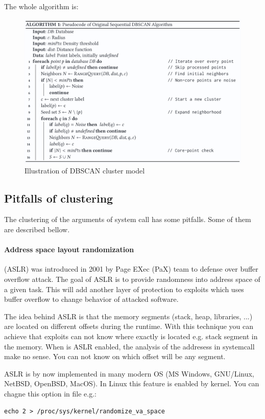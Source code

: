 	The whole algorithm is:
	\nopagebreak
	\begin{figure}[H]
		\centering
		\includegraphics[width=\linewidth]{obrazky-figures/algo_dbscan}
		\caption{Illustration of DBSCAN cluster model}
		\label{dbscan_ilustration}
	\end{figure}


\subsection{Pitfalls of clustering}
The clustering of the arguments of system call has some pitfalls.
Some of them are described bellow.

\paragraph{Address space layout randomization}
(ASLR) was introduced in 2001 by Page EXec (PaX) team to defense over buffer overflow attack. \cite{ASLR:PAX, Ganz2017}
The goal of ASLR is to provide randomness into address space of a given task.
This will add another layer of protection to exploits which uses buffer overflow to change behavior of attacked software.

The idea behind ASLR is that the memory segments (stack, heap, libraries, ...) are located on different offsets during the runtime.
With this technique you can achieve that exploits can not know where exactly is located e.g. stack segment in the memory.
When is ASLR enabled, the analysis of the addresess in systemcall make no sense.
You can not know on which offset will be any segment.

ASLR is by now implemented in many modern OS (MS Windows, GNU/Linux, NetBSD, OpenBSD, MacOS).
In Linux this feature is enabled by kernel. You can chagne this option in file e.g.:
\begin{center}
	\texttt{echo 2 > /proc/sys/kernel/randomize\_va\_space}
\end{center}


